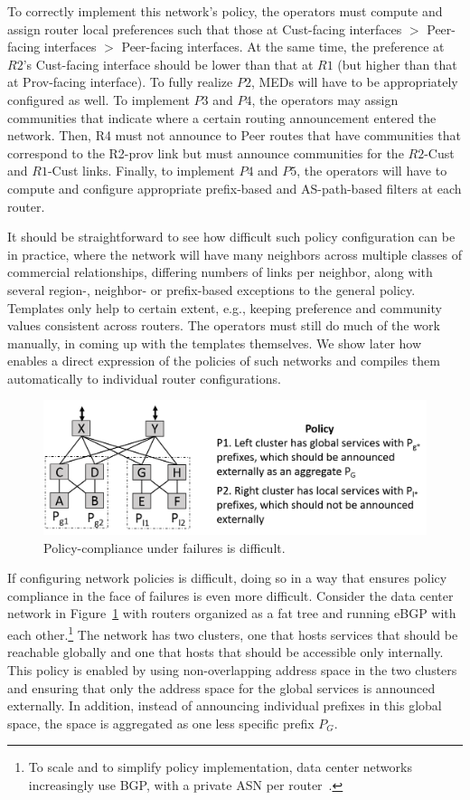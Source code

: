 To correctly implement this network's policy, the operators must compute and assign router local preferences such that those at Cust-facing interfaces $>$ Peer-facing interfaces $>$ Peer-facing interfaces. At the same time, the preference at $R2$'s Cust-facing interface should be lower than that at $R1$ (but higher than that at Prov-facing interface). To fully realize $P2$, MEDs will have to be appropriately configured as well. To implement $P3$ and $P4$, the operators may assign communities that indicate where a certain routing announcement entered the network. Then, R4 must not announce to Peer routes that have communities that correspond to the R2-prov link but must announce communities for the $R2$-Cust and $R1$-Cust links. Finally, to implement $P4$ and $P5$, the operators will have to compute and configure appropriate prefix-based and AS-path-based filters at each router.

It should be straightforward to see how difficult such policy configuration can be in practice, where the network will have many neighbors across multiple classes of commercial relationships, differing numbers of links per neighbor, along with several region-, neighbor- or prefix-based exceptions to the general policy. Templates only help to certain extent, e.g., keeping preference and community values consistent across routers. The operators must still do much of the work manually, in coming up with the templates themselves. We show later how \sysname enables a direct expression of the policies of such networks and compiles them automatically to individual router configurations. 

\begin{figure}[t!]
\centering
\includegraphics[width=\columnwidth]{figures/example2}
\caption{Policy-compliance under failures is difficult.}
\label{fig:example2}
\end{figure}

If configuring network policies is difficult, doing so in a way that ensures policy compliance in the face of failures is even more difficult. Consider the data center network in Figure~\ref{fig:example2} with routers organized as a fat tree and running eBGP with each other.\footnote{To scale and to simplify policy implementation, data center networks increasingly use BGP, with a private ASN per router~\cite{bgp-in-dc-rfc}.} The network has two clusters, one that hosts services that should be reachable globally and one that hosts that should be accessible only internally. This policy is enabled by using non-overlapping address space in the two clusters and ensuring that only the address space for the global services is announced externally. In addition, instead of announcing individual prefixes in this global space, the space is aggregated as one less specific prefix $P_G$.

